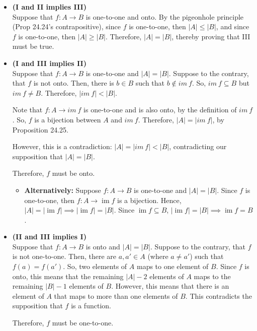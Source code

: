 \documentclass{article}
\newcommand{\im}{\operatorname{im}}
\theoremstyle{definition}
\begin{document}
\begin{solution}
\begin{itemize}
\item \textbf{(I and II implies III)}\\
Suppose that $f:A \rightarrow B$ is one-to-one and onto.  By the pigeonhole principle (Prop 24.24's contrapositive), since $f$ is one-to-one, then $|A| \leq |B|$, and since $f$ is one-to-one, then $|A| \geq |B|$.  Therefore, $|A| = |B|$, thereby proving that III must be true.

\item \textbf{(I and III implies II)}\\
Suppose that $f:A \rightarrow B$ is one-to-one and $|A| = |B|$.  Suppose to the contrary, that $f$ is not onto.  Then, there is $b \in B$ such that $b \notin im \ f$.  So, $im \ f \subseteq B$ but $im \ f \neq B$.  Therefore, $|im \ f| < |B|$.

Note that $f:A \rightarrow im \ f$ is one-to-one and is also onto, by the definition of $im \ f$.  So, $f$ is a bijection between $A$ and $im \ f$.  Therefore, $|A| = |im \ f|$, by Proposition 24.25.

However, this is a contradiction: $|A| = |im \ f| < |B|$, contradicting our supposition that $|A| = |B|$.

Therefore, $f$ must be onto.

\begin{itemize}
\item \textbf{Alternatively:} Suppose $f:A\to B$ is one-to-one and $|A|=|B|$. Since $f$ is one-to-one, then $f:A\to \im f$ is a bijection. Hence, $|A|=|\im f|\implies |\im f|=|B|$. Since $\im f\subseteq B$, $|\im f|=|B|\implies \im f=B$.
\end{itemize}

\item \textbf{(II and III implies I)}\\
Suppose that $f:A \rightarrow B$ is onto and $|A| = |B|$.  Suppose to the contrary, that $f$ is not one-to-one.  Then, there are $a, a' \in A$ (where $a \neq a'$) such that $f(a) = f(a')$.  So, two elements of $A$ maps to one element of $B$.  Since $f$ is onto, this means that the remaining $|A|-2$ elements of $A$ maps to the remaining $|B|-1$ elements of $B$.  However, this means that there is an element of $A$ that maps to more than one elements of $B$. This contradicts the supposition that $f$ is a function.

Therefore, $f$ must be one-to-one.


\end{itemize}
\end{solution}
\end{document}
